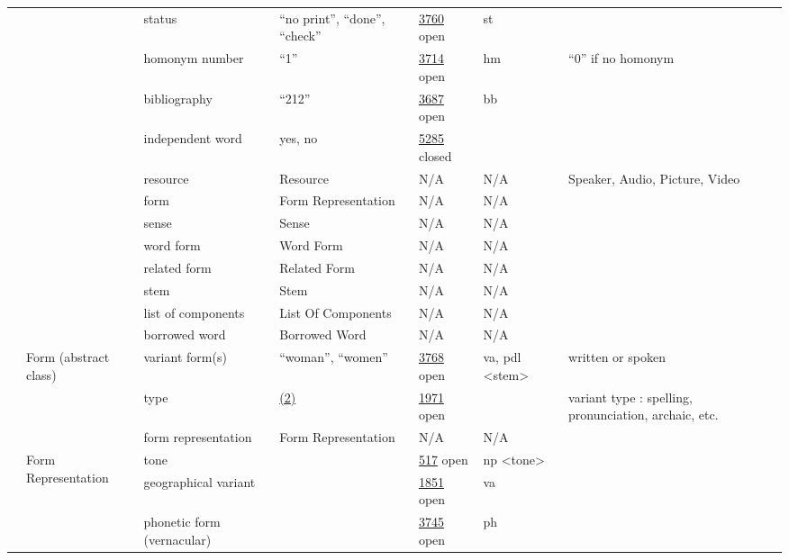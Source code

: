 \documentclass[a4paper,12pt]{article}
\begin{document}
\begin{center}
\begin{longtable}{*7{p{2cm}}}
& & status & ``no print'', ``done'', ``check'' & \href{http://www.isocat.org/datcat/DC-3760}{3760} open & st & \\ \cmidrule{3-7}
& & homonym number & ``1'' & \href{http://www.isocat.org/datcat/DC-3714}{3714} open & hm & ``0'' if no homonym \\ \cmidrule{3-7}
& & bibliography & ``212'' & \href{http://www.isocat.org/datcat/DC-3687}{3687} open & bb & \\ \cmidrule{3-7}
& & independent word & yes, no & \href{http://www.isocat.org/datcat/DC-5285}{5285} closed & & \\ \cmidrule{3-7}
& & resource & Resource & N/A & N/A & Speaker, Audio, Picture, Video \\ \cmidrule{3-7}
& & form & Form Re\-pre\-sen\-ta\-tion & N/A & N/A & \\ \cmidrule{3-7}
& & sense & Sense & N/A & N/A & \\ \cmidrule{3-7}
& & word form & Word Form & N/A & N/A & \\ \cmidrule{3-7}
& & related form & Related Form & N/A & N/A & \\ \cmidrule{3-7}
& & stem & Stem & N/A & N/A & \\ \cmidrule{3-7}
& & list of components & List Of Components & N/A & N/A & \\ \cmidrule{3-7}
& & borrowed word & Borrowed Word & N/A & N/A & \\ \cmidrule{2-7}
& \multirow{3}{2cm}{Form (abstract class)} & variant form(s) & ``woman'', ``women'' & \href{http://www.isocat.org/datcat/DC-3768}{3768} open & va, pdl \textless stem\textgreater & written or spoken \\ \cmidrule{3-7}
& & type & \hyperlink{2}{(2)} \hypertarget{type}{} & \href{http://www.isocat.org/datcat/DC-1971}{1971} open & & variant type : spelling, pronunciation, archaic, etc. \\ \cmidrule{3-7}
& & form representation & Form Re\-pre\-sen\-ta\-tion & N/A & N/A & \\ \cmidrule{2-7}
& \multirow{14}{2cm}{Form Re\-pre\-sen\-ta\-tion} & tone & & \href{http://www.isocat.org/datcat/DC-517}{517} open & np \textless tone\textgreater & \\ \cmidrule{3-7}
& & geographical variant & & \href{http://www.isocat.org/datcat/DC-1851}{1851} open & va & \\ \cmidrule{3-7}
& & phonetic form (vernacular) & & \href{http://www.isocat.org/datcat/DC-3745}{3745} open & ph & \\ \cmidrule{3-7}

\end{longtable}
\end{center}
\end{document}
